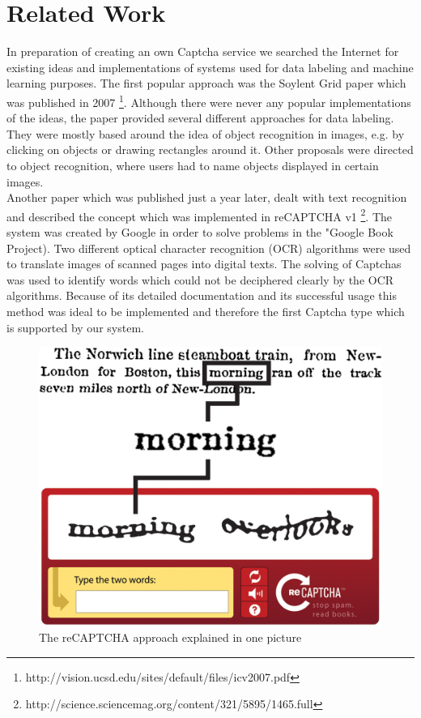 \section{Related Work}
\label{sec:related_work}

In preparation of creating an own Captcha service we searched the Internet for existing ideas and implementations of systems used for data labeling and machine learning purposes. The first popular approach was the Soylent Grid paper which was published in 2007 \footnote{http://vision.ucsd.edu/sites/default/files/icv2007.pdf}. Although there were never any popular implementations of the ideas, the paper provided several different approaches for data labeling. They were mostly based around the idea of object recognition in images, e.g. by clicking on objects or drawing rectangles around it. Other proposals were directed to object recognition, where users had to name objects displayed in certain images.\\
Another paper which was published just a year later, dealt with text recognition and described the concept which was implemented in reCAPTCHA v1 \footnote{http://science.sciencemag.org/content/321/5895/1465.full}. The system was created by Google in order to solve problems in the "Google Book Project). Two different optical character recognition (OCR) algorithms were used to translate images of scanned pages into digital texts. The solving of Captchas was used to identify words which could not be deciphered clearly by the OCR algorithms. Because of its detailed documentation and its successful usage this method was ideal to be implemented and therefore the first Captcha type which is supported by our system. \\
\begin{figure}[!h]
	\centering
	\includegraphics[width=0.4\linewidth]{content/figures/recaptcha.jpg}
	\caption{The reCAPTCHA approach explained in one picture}
	\label{fig:recaptcha}
\end{figure}
\clearpage